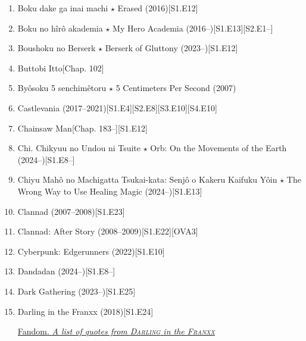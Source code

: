 \documentclass{article}
\begin{document}
\begin{enumerate}
\begin{itemize}
    \end{itemize}
    \item {\sc Boku dake ga inai machi $\star$ Erased} (2016)\hfill[S1.E12]
    \item Boku no hîrô akademia $\star$ My Hero Academia (2016--)\hfill[S1.E13][S2.E1--]
    \item {\sc Boushoku no Berserk $\star$ Berserk of Gluttony} (2023--)\hfill[S1.E12]
    \item {\sc Buttobi Itto}\hfill[Chap. 102]
    \item {\sc By\^osoku 5 senchimêtoru $\star$ 5 Centimeters Per Second} (2007)
    \item {\sc Castlevania} (2017--2021)\hfill[S1.E4][S2.E8][S3.E10][S4.E10]
    \item {\sc Chainsaw Man}\hfill[Chap. 183--][S1.E12]
    \item Chi. Chikyuu no Undou ni Tsuite $\star$ Orb: On the Movements of the Earth (2024--)\hfill[S1.E8--]
    \item {\sc Chiyu Mahô no Machigatta Tsukai-kata: Senjô o Kakeru Kaifuku Yôin $\star$ The Wrong Way to Use Healing Magic} (2024--)[S1.E13]
    \item {\sc Clannad} (2007--2008)\hfill[S1.E23]
    \item {\sc Clannad: After Story} (2008--2009)\hfill[S1.E22][OVA3]
    \item {\sc Cyberpunk: Edgerunners} (2022)\hfill[S1.E10]
    \item Dandadan (2024--)\hfill[S1.E8--]
    \item {\sc Dark Gathering} (2023--)\hfill[S1.E25]
    \item {\sc Darling in the Franxx} (2018)\hfill[S1.E24]
    
    \href{https://darling-in-the-franxx.fandom.com/wiki/List_of_Quotes}{Fandom. {\it A list of quotes from \textsc{Darling} in the \textsc{Franxx}}}
    

\end{enumerate}
\end{document}
